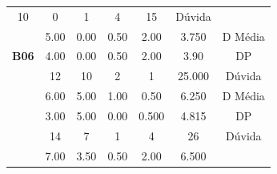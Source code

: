 \begin{table}[htbp]
\begin{tabular}{|ccccccc|}
		\multicolumn{1}{c|}{10} &
		\multicolumn{1}{c|}{0} &
		\multicolumn{1}{c|}{1} &
		\multicolumn{1}{c|}{4} &
		\multicolumn{1}{c|}{15} &
		Dúvida \\ \cline{2-7} 
		\rowcolor[HTML]{D9D9D9} 
		\multicolumn{1}{|c|}{\cellcolor[HTML]{F2F2F2}} &
		\multicolumn{1}{c|}{\cellcolor[HTML]{D9D9D9}5.00} &
		\multicolumn{1}{c|}{\cellcolor[HTML]{D9D9D9}0.00} &
		\multicolumn{1}{c|}{\cellcolor[HTML]{D9D9D9}0.50} &
		\multicolumn{1}{c|}{\cellcolor[HTML]{D9D9D9}2.00} &
		\multicolumn{1}{c|}{\cellcolor[HTML]{D9D9D9}3.750} &
		D Média \\ \cline{2-7} 
		\multicolumn{1}{|c|}{\multirow{-3}{*}{\cellcolor[HTML]{F2F2F2}\textbf{B06}}} &
		\multicolumn{1}{c|}{4.00} &
		\multicolumn{1}{c|}{0.00} &
		\multicolumn{1}{c|}{0.50} &
		\multicolumn{1}{c|}{2.00} &
		\multicolumn{1}{c|}{3.90} &
		DP \\ \hline
		\rowcolor[HTML]{D9D9D9} 
		\multicolumn{1}{|c|}{\cellcolor[HTML]{F2F2F2}} &
		\multicolumn{1}{c|}{\cellcolor[HTML]{D9D9D9}12} &
		\multicolumn{1}{c|}{\cellcolor[HTML]{D9D9D9}10} &
		\multicolumn{1}{c|}{\cellcolor[HTML]{D9D9D9}2} &
		\multicolumn{1}{c|}{\cellcolor[HTML]{D9D9D9}1} &
		\multicolumn{1}{c|}{\cellcolor[HTML]{D9D9D9}25.000} &
		Dúvida \\ \cline{2-7} 
		\multicolumn{1}{|c|}{\cellcolor[HTML]{F2F2F2}} &
		\multicolumn{1}{c|}{6.00} &
		\multicolumn{1}{c|}{5.00} &
		\multicolumn{1}{c|}{1.00} &
		\multicolumn{1}{c|}{0.50} &
		\multicolumn{1}{c|}{6.250} &
		D Média \\ \cline{2-7} 
		\rowcolor[HTML]{D9D9D9} 
		\multicolumn{1}{|c|}{\multirow{-3}{*}{\cellcolor[HTML]{F2F2F2}\textbf{B08}}} &
		\multicolumn{1}{c|}{\cellcolor[HTML]{D9D9D9}3.00} &
		\multicolumn{1}{c|}{\cellcolor[HTML]{D9D9D9}5.00} &
		\multicolumn{1}{c|}{\cellcolor[HTML]{D9D9D9}0.00} &
		\multicolumn{1}{c|}{\cellcolor[HTML]{D9D9D9}0.500} &
		\multicolumn{1}{c|}{\cellcolor[HTML]{D9D9D9}4.815} &
		DP \\ \hline
		\multicolumn{1}{|c|}{\cellcolor[HTML]{F2F2F2}} &
		\multicolumn{1}{c|}{14} &
		\multicolumn{1}{c|}{7} &
		\multicolumn{1}{c|}{1} &
		\multicolumn{1}{c|}{4} &
		\multicolumn{1}{c|}{26} &
		Dúvida \\ \cline{2-7} 
		\rowcolor[HTML]{D9D9D9} 
		\multicolumn{1}{|c|}{\cellcolor[HTML]{F2F2F2}} &
		\multicolumn{1}{c|}{\cellcolor[HTML]{D9D9D9}7.00} &
		\multicolumn{1}{c|}{\cellcolor[HTML]{D9D9D9}3.50} &
		\multicolumn{1}{c|}{\cellcolor[HTML]{D9D9D9}0.50} &
		\multicolumn{1}{c|}{\cellcolor[HTML]{D9D9D9}2.00} &
		\multicolumn{1}{c|}{\cellcolor[HTML]{D9D9D9}6.500} &

\end{tabular}
\end{table}
